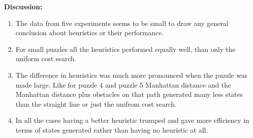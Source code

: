 \documentclass[12pt]{article}
\begin{document}
{\bf Discussion:} 
\begin{enumerate}
	\item The data from five experiments seems to be small to draw any general conclusion about heuristics or their performance.
	\item For small puzzles all the heuristics performed equally well, than only the uniform cost search.
	\item The difference in heuristics was much more pronounced when the puzzle was made large. Like for puzzle 4 and puzzle 5 Manhattan distance and the Manhattan distance plus obstacles on that path generated many less states than the straight line or just the unifrom cost search.
	\item In all the cases having a better heuristic trumped and gave more efficiency in terms of states generated rather than having no heuristic at all.
\end{enumerate}
\end{document}
